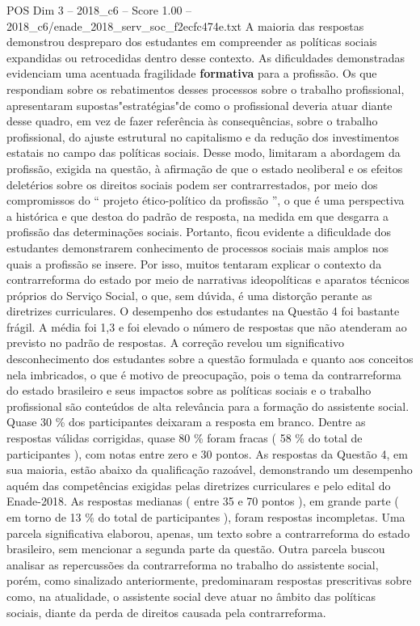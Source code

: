 \begin{textsample}{POS Dim 3 – 2018\_c6 – Score 1.00 – 2018\_c6/enade\_2018\_serv\_soc\_f2ecfc474e.txt}
A maioria das respostas demonstrou despreparo dos estudantes em compreender as políticas sociais expandidas ou retrocedidas dentro desse contexto.
As dificuldades demonstradas evidenciam uma acentuada fragilidade \textbf{formativa} para a profissão.
Os que respondiam sobre os rebatimentos desses processos sobre o trabalho profissional, apresentaram supostas"estratégias"de como o profissional deveria atuar diante desse quadro, em vez de fazer referência às consequências, sobre o trabalho profissional, do ajuste estrutural no capitalismo e da redução dos investimentos estatais no campo das políticas sociais.
Desse modo, limitaram a abordagem da profissão, exigida na questão, à afirmação de que o estado neoliberal e os efeitos deletérios sobre os direitos sociais podem ser contrarrestados, por meio dos compromissos do “ projeto ético-político da profissão ”, o que é uma perspectiva a histórica e que destoa do padrão de resposta, na medida em que desgarra a profissão das determinações sociais.
Portanto, ficou evidente a dificuldade dos estudantes demonstrarem conhecimento de processos sociais mais amplos nos quais a profissão se insere.
Por isso, muitos tentaram explicar o contexto da contrarreforma do estado por meio de narrativas ideopolíticas e aparatos técnicos próprios do Serviço Social, o que, sem dúvida, é uma distorção perante as diretrizes curriculares.
O desempenho dos estudantes na Questão 4 foi bastante frágil.
A média foi 1,3 e foi elevado o número de respostas que não atenderam ao previsto no padrão de respostas.
A correção revelou um significativo desconhecimento dos estudantes sobre a questão formulada e quanto aos conceitos nela imbricados, o que é motivo de preocupação, pois o tema da contrarreforma do estado brasileiro e seus impactos sobre as políticas sociais e o trabalho profissional são conteúdos de alta relevância para a formação do assistente social.
Quase 30 \% dos participantes deixaram a resposta em branco.
Dentre as respostas válidas corrigidas, quase 80 \% foram fracas ( 58 \% do total de participantes ), com notas entre zero e 30 pontos.
As respostas da Questão 4, em sua maioria, estão abaixo da qualificação razoável, demonstrando um desempenho aquém das competências exigidas pelas diretrizes curriculares e pelo edital do Enade-2018.
As respostas medianas ( entre 35 e 70 pontos ), em grande parte ( em torno de 13 \% do total de participantes ), foram respostas incompletas.
Uma parcela significativa elaborou, apenas, um texto sobre a contrarreforma do estado brasileiro, sem mencionar a segunda parte da questão.
Outra parcela buscou analisar as repercussões da contrarreforma no trabalho do assistente social, porém, como sinalizado anteriormente, predominaram respostas prescritivas sobre como, na atualidade, o assistente social deve atuar no âmbito das políticas sociais, diante da perda de direitos causada pela contrarreforma.

\end{textsample}
